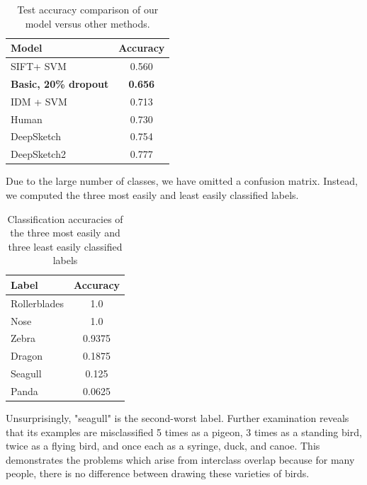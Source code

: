\documentclass[10pt,twocolumn,letterpaper]{article}
\begin{document}
\begin{table}[h]
        \begin{center}
        \begin{tabular}{l | c}
        Model & Accuracy \\
        \hline\hline
        SIFT+ SVM  ~\cite{eitz2012hdhso}  &  0.560 \\
        \textbf{Basic, 20\% dropout}& \textbf{0.656} \\
        IDM + SVM ~\cite{yesilbek2015svm} & 0.713 \\
        Human ~\cite{eitz2012hdhso} & 0.730 \\
        DeepSketch ~\cite{seddati2015deepsketch}  & 0.754\\
        DeepSketch2 ~\cite{seddati2016deepsketch} & 0.777\\
        \end{tabular}
        \end{center}
        \caption{Test accuracy comparison of our model versus other methods.}
\end{table}

Due to the large number of classes, we have omitted a confusion matrix. Instead, we computed the three most easily and least easily classified labels. 

\begin{table}[h]
        \begin{center}
        \begin{tabular}{l | c}
        Label & Accuracy \\
        \hline\hline
        Rollerblades & 1.0 \\
        Nose & 1.0 \\
        Zebra & 0.9375 \\ \hline
        Dragon & 0.1875 \\
        Seagull & 0.125 \\
        Panda & 0.0625
        \end{tabular}
        \end{center}
        \caption{Classification accuracies of the three most easily and three least easily classified labels}
\end{table}

Unsurprisingly, "seagull" is the second-worst label. Further examination reveals that its examples are misclassified 5 times as a pigeon, 3 times as a standing bird, twice as a flying bird, and once each as a syringe, duck, and canoe. This demonstrates the problems which arise from interclass overlap because for many people, there is no difference between drawing these varieties of birds. 
\end{document}
